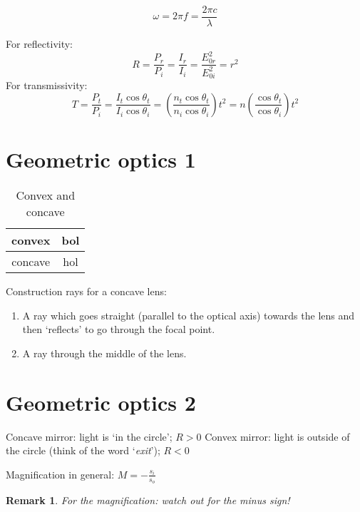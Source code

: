 \documentclass{article}
\newtheorem*{remark}{Remark}
\begin{document}
$$\omega=2\pi f=\frac{2\pi c}{\lambda}$$

\noindent
For reflectivity:
\begin{equation}
    R=\frac{P_r}{P_i}=\frac{I_r}{I_i}=\frac{E_{0r}^2}{E_{0i}^2}=r^2
\end{equation}
For transmissivity:
\begin{equation}
    T=\frac{P_t}{P_i}=\frac{I_t \cos{\theta_t}}{I_i \cos{\theta_i}}=\left(\frac{n_t\cos{\theta_t}}{n_i\cos{\theta_i}}\right)t^2=n\left(\frac{\cos{\theta_t}}{\cos{\theta_i}}\right)t^2
\end{equation}

\section{Geometric optics 1}

\begin{table}[H]
    \centering
    \begin{tabular}{c|c}
         convex & bol \\ \hline
         concave & hol
    \end{tabular}
    \caption{Convex and concave}
    \label{tab:my_label}
\end{table}

Construction rays for a concave lens:
\begin{enumerate}
    \item A ray which goes straight (parallel to the optical axis) towards the lens and then `reflects' to go through the focal point.
    \item A ray through the middle of the lens.
\end{enumerate}

\section{Geometric optics 2}
Concave mirror: light is `in the circle'; $R>0$\newline
Convex mirror: light is outside of the circle (think of the word `\emph{exit}'); $R<0$

\noindent{}Magnification in general: $M=-\frac{s_i}{s_o}$
\begin{remark}
For the magnification: watch out for the minus sign!
\end{remark}
\end{document}
